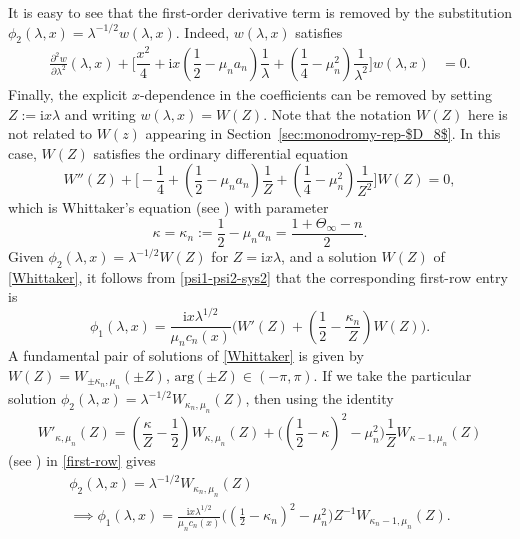 \documentclass[11pt]{article}
\numberwithin{equation}{section}
\numberwithin{equation}{section}
\newcommand{\ii}{\mathrm{i}}
\begin{document}
It is easy to see that the first-order derivative term is removed by the substitution $\phi_2(\lambda,x)=\lambda^{-1/2}w(\lambda,x)$.
Indeed, $w(\lambda,x)$ satisfies
\begin{align*}
 \frac{\partial^2w}{\partial\lambda^2}(\lambda,x) + \bigg[ \dfrac{x^2}{4} + \ii x\left( \dfrac{1}{2} - \mu_n a_n \right) \dfrac{1}{\lambda} + \left( \dfrac{1}{4} - \mu_n^2 \right) \dfrac{1}{\lambda^2} \bigg]w(\lambda,x) &= 0.
\end{align*}
Finally, the explicit $x$-dependence in the coefficients can be removed by setting $Z:= \ii x \lambda$ and writing $w(\lambda,x)=W(Z)$. Note that the notation $W(Z)$ here is not related to $W(z)$ appearing in Section~\ref{sec:monodromy-rep-$D_8$}. In this case, $W(Z)$ satisfies the ordinary differential equation
\begin{equation}
 W''(Z) + \bigg[ - \dfrac{1}{4} + \left( \dfrac{1}{2} - \mu_n a_n \right) \dfrac{1}{Z} + \left( \dfrac{1}{4} - \mu_n^2 \right) \dfrac{1}{Z^2} \bigg] W(Z) = 0,
 \label{Whittaker}
\end{equation}
which is Whittaker's equation (see \cite[Chapter~13]{DLMF}) with parameter
\begin{equation}\label{kappa-mu}
 \kappa = \kappa_n:=\frac{1}{2} - \mu_n a_n = \dfrac{1+\Theta_\infty - n }{2}.
\end{equation}
Given $\phi_2(\lambda,x)=\lambda^{-1/2}W(Z)$ for $Z=\ii x\lambda$, and a solution $W(Z)$ of \eqref{Whittaker}, it follows from \eqref{psi1-psi2-sys2} that the corresponding first-row entry is
\begin{equation}
 \phi_1(\lambda,x)=\frac{\ii x\lambda^{1/2}}{\mu_n c_n(x)}\bigg(W'(Z)+\left(\frac{1}{2}-\frac{\kappa_n}{Z}\right)W(Z)\bigg).
 \label{first-row}
\end{equation}
A fundamental pair of solutions of \eqref{Whittaker} is given by $W(Z)=W_{\pm \kappa_n, \mu_n} (\pm Z)$, $\mathrm{arg}(\pm Z) \in (-\pi, \pi) $.
If we take the particular solution $\phi_2(\lambda,x)=\lambda^{-1/2}W_{\kappa_n,\mu_n}(Z)$, then
using the identity
\begin{equation*}
 W'_{\kappa,\mu_n}(Z)=\left(\dfrac{\kappa}{Z}-\dfrac{1}{2}\right)W_{\kappa,\mu_n}(Z)+\bigg(\left(\dfrac{1}{2}-\kappa\right)^2-\mu_n^2\bigg)\frac{1}{Z}W_{\kappa-1,\mu_n}(Z)
\end{equation*}
(see \cite[equation~(13.15.23)]{DLMF}) in \eqref{first-row} gives
\begin{gather*}
 \phi_2(\lambda,x)=\lambda^{-1/2}W_{\kappa_n,\mu_n}(Z)\\
\implies \phi_1(\lambda,x)=\frac{\ii x\lambda^{1/2}}{\mu_n c_n(x)}\bigg(\left(\frac{1}{2}-\kappa_n\right)^2-\mu_n^2\bigg)Z^{-1}W_{\kappa_n-1,\mu_n}(Z).
\end{gather*}
\end{document}
